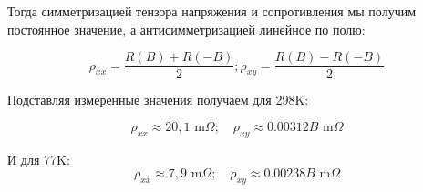 \documentclass[a4paper, 12pt]{article}
\begin{document}
Тогда симметризацией тензора напряжения и сопротивления мы получим постоянное значение, а антисимметризацией линейное по полю:

$$ \rho_{xx}=\frac{R(B)+R(-B)}{2};\rho_{xy}=\frac{R(B)-R(-B)}{2}$$

Подставляя измеренные значения получаем для 298K:

$$\rho_{xx}\approx 20,1 \text{ m$\Omega$}; \quad \rho_{xy}\approx0.00312B \text{ m$\Omega$}$$

И для 77K:
$$\rho_{xx}\approx7,9 \text{ m$\Omega$}; \quad \rho_{xy}\approx0.00238B \text{ m$\Omega$}$$
\end{document}
